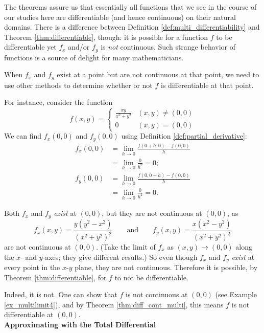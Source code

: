 The theorems assure us that  essentially all functions that we see in the course of our studies here are differentiable (and hence continuous) on their natural domains. There is a difference between Definition \ref{def:multi_differentiability} and Theorem \ref{thm:differentiable}, though: it is possible for a function $f$ to be differentiable yet $f_x$ and/or $f_y$ is \textit{not} continuous. Such strange behavior of functions is a source of delight for many mathematicians.

When $f_x$ and $f_y$  exist at a point but are not continuous at that point, we need to use other methods to determine whether or not $f$ is differentiable at that point.

For instance, consider the function 
$$f(x,y) = \left\{\begin{array}{cl} \frac{xy}{x^2+y^2} & (x,y)\neq (0,0) \\
																0 & (x,y) = (0,0)\end{array}\right.$$
We can find $f_x(0,0)$ and $f_y(0,0)$ using Definition 	\ref{def:partial_derivative}:
\begin{align*}
f_x(0,0) &= \lim_{h\to 0} \frac{f(0+h,0) - f(0,0)}{h} \\
				&= \lim_{h\to 0} \frac{0}{h^2} = 0;\\
f_y(0,0) &= \lim_{h\to 0} \frac{f(0,0+h) - f(0,0)}{h} \\
				&= \lim_{h\to 0} \frac{0}{h^2} = 0.
\end{align*}

Both $f_x$ and $f_y$ \textit{exist} at $(0,0)$, but they are not continuous at $(0,0)$, as 
$$f_x(x,y) = \frac{y(y^2-x^2)}{(x^2+y^2)^2} \qquad \text{and}\qquad f_y(x,y) = \frac{x(x^2-y^2)}{(x^2+y^2)^2} $$ are not continuous at $(0,0)$. (Take the limit of $f_x$ as $(x,y)\to(0,0)$ along the $x$- and $y$-axes; they give different results.) So even though $f_x$ and $f_y$ \textit{exist} at every point in the $x$-$y$ plane, they are not continuous. Therefore it is possible, by Theorem \ref{thm:differentiable}, for $f$ to not be differentiable.

 Indeed, it is not. One can show that $f$ is not continuous at $(0,0)$ (see Example \ref{ex_multilimit4}), and by Theorem \ref{thm:diff_cont_multi}, this means $f$ is not differentiable at $(0,0)$.\\
														

\noindent\textbf{\large Approximating with the Total Differential}\\


